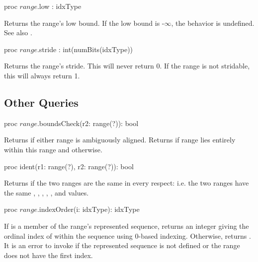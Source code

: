 \begin{protohead}
proc $range$.low : idxType
\end{protohead}
\begin{protobody}
Returns the range's low bound.
If the low bound is -$\infty$, the behavior is undefined.
See also .
\end{protobody}

\begin{protohead}
proc $range$.stride : int(numBits(idxType))
\end{protohead}
\begin{protobody}
Returns the range's stride. This will never return 0.
If the range is not stridable, this will always return 1.
\end{protobody}

\subsection{Other Queries}
\label{Range_Queries}

\begin{protohead}
proc $range$.boundsCheck(r2: range(?)): bool
\end{protohead}
\begin{protobody}
Returns  if either range is ambiguously aligned.
Returns  if range  lies entirely within this range
and  otherwise.  
\end{protobody}

\begin{protohead}
proc ident(r1: range(?), r2: range(?)): bool
\end{protohead}
\begin{protobody}
Returns  if the two ranges are the same in every respect: i.e. the
two ranges have the same ,
, , , ,  and
 values.
\end{protobody}

\begin{protohead}
proc $range$.indexOrder(i: idxType): idxType
\end{protohead}
\begin{protobody}
If  is a member of the range's represented sequence, returns an integer giving
the ordinal index of  within the sequence using 0-based indexing.
Otherwise, returns .
It is an error to invoke  if the represented sequence
is not defined or the range does not have the first index.
\end{protobody}

